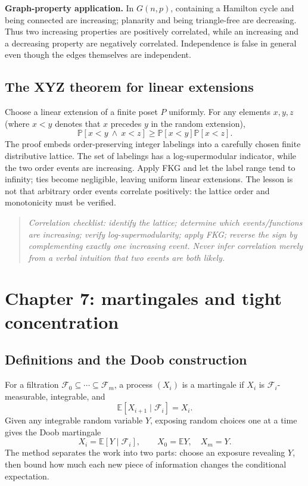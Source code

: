 \documentclass[10pt]{article}
\newcommand{\E}{\mathbb E}
\newcommand{\Prb}{\mathbb P}
\newcommand{\1}{\mathbf 1}
\newenvironment{keybox}{\begin{quote}\small\itshape}{\end{quote}}
\begin{document}
\textbf{Graph-property application.}  In $G(n,p)$, containing a Hamilton cycle
and being connected are increasing; planarity and being triangle-free are
decreasing.  Thus two increasing properties are positively correlated, while
an increasing and a decreasing property are negatively correlated.
Independence is false in general even though the edges themselves are independent.

\subsection{The XYZ theorem for linear extensions}

Choose a linear extension of a finite poset $P$ uniformly.  For any elements
$x,y,z$ (where $x<y$ denotes that $x$ precedes $y$ in the random extension),
\[
 \Prb[x<y\ \wedge\ x<z]\geq
 \Prb[x<y]\Prb[x<z].                                  \tag{XYZ}
\]
The proof embeds order-preserving integer labelings into a carefully chosen
finite distributive lattice.  The set of labelings has a log-supermodular
indicator, while the two order events are increasing.  Apply FKG and let the
label range tend to infinity; ties become negligible, leaving uniform linear
extensions.  The lesson is not that arbitrary order events correlate positively:
the lattice order and monotonicity must be verified.

\begin{keybox}
Correlation checklist: identify the lattice; determine which events/functions
are increasing; verify log-supermodularity; apply FKG; reverse the sign by
complementing exactly one increasing event.  Never infer correlation merely from
a verbal intuition that two events are both likely.
\end{keybox}

\section{Chapter 7: martingales and tight concentration}

\subsection{Definitions and the Doob construction}

For a filtration
$\mathcal F_0\subseteq\cdots\subseteq\mathcal F_m$, a process $(X_i)$ is a
martingale if $X_i$ is $\mathcal F_i$-measurable, integrable, and
\[
 \E[X_{i+1}\mid\mathcal F_i]=X_i.
\]
Given any integrable random variable $Y$, exposing random choices one at a time
gives the Doob martingale
\[
 X_i=\E[Y\mid\mathcal F_i],\qquad X_0=\E Y,\quad X_m=Y.
\]
The method separates the work into two parts: choose an exposure revealing $Y$,
then bound how much each new piece of information changes the conditional
expectation.
\end{document}
